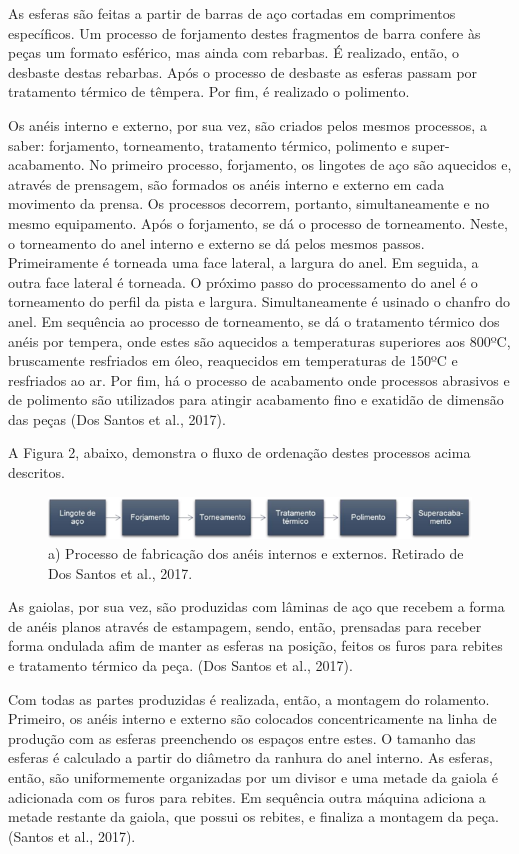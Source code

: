 \documentclass[
	12pt,				
	oneside,			
	a4paper,			
	english,			
	brazil				
	]{abntex2ppgsi}
\begin{document}
As esferas são feitas a partir de barras de aço cortadas em comprimentos específicos. Um processo de forjamento destes fragmentos de barra confere às peças um formato esférico, mas ainda com rebarbas. É realizado, então, o desbaste destas rebarbas. Após o processo de desbaste as esferas passam por tratamento térmico de têmpera. Por fim, é realizado o polimento. 

Os anéis interno e externo, por sua vez, são criados pelos mesmos processos, a saber: forjamento, torneamento, tratamento térmico, polimento e super-acabamento. No  primeiro processo, forjamento, os lingotes de aço são aquecidos e, através de prensagem, são formados os anéis interno e externo em cada movimento da prensa. Os processos decorrem, portanto, simultaneamente e no mesmo equipamento. Após o forjamento, se dá o processo de torneamento. Neste, o torneamento do anel interno e externo se dá pelos mesmos passos. Primeiramente é torneada uma face lateral, a largura do anel. Em seguida, a outra face lateral é torneada. O próximo passo do processamento do anel é o torneamento do perfil da pista e largura. Simultaneamente é usinado o chanfro do anel. Em sequência ao processo de torneamento, se dá o tratamento térmico dos anéis por tempera, onde estes são aquecidos a temperaturas superiores aos 800ºC, bruscamente resfriados em óleo, reaquecidos em temperaturas de 150ºC e resfriados ao ar. Por fim, há o processo de acabamento onde processos abrasivos e de polimento são utilizados para atingir acabamento fino e exatidão de dimensão das peças (Dos Santos et al., 2017). 

A Figura 2, abaixo, demonstra o fluxo de ordenação destes processos acima descritos.
\begin{figure}[!htb]
\centering
\includegraphics{Figura2}
\caption{a) Processo de fabricação dos anéis internos e externos. Retirado de Dos Santos et al., 2017.}
\label{Figura2}
\end{figure}

As gaiolas, por sua vez, são produzidas com lâminas de aço que recebem a forma de anéis planos através de estampagem, sendo, então, prensadas para receber forma ondulada afim de manter as esferas na posição, feitos os furos para rebites e tratamento térmico da peça. (Dos Santos et al., 2017).
 
Com todas as partes produzidas é realizada, então, a montagem do rolamento. Primeiro, os anéis interno e externo são colocados concentricamente na linha de produção com as esferas preenchendo os espaços entre estes. O tamanho das esferas é calculado a partir do diâmetro da ranhura do anel interno. As esferas, então, são uniformemente organizadas por um divisor e uma metade da gaiola é adicionada com os furos para rebites. Em sequência outra máquina adiciona a metade restante da gaiola, que possui os rebites, e finaliza a montagem da peça. (Santos et al., 2017). 
\end{document}
